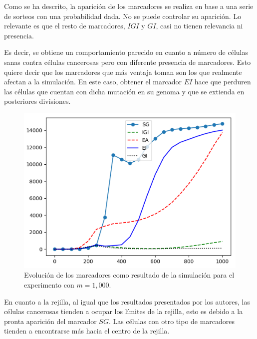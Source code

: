 Como se ha descrito, la aparición de los marcadores se realiza en base a una serie de sorteos con una probabilidad dada.
No se puede controlar su aparición. Lo relevante es que el resto de marcadores, $IGI$ y $GI$, casi no tienen relevancia
ni presencia.

Es decir, se obtiene un comportamiento parecido en cuanto a número de células sanas contra células cancerosas pero
con diferente presencia de marcadores. Esto quiere decir que los marcadores que más ventaja toman son los que realmente
afectan a la simulación. En este caso, obtener el marcador $EI$ hace que perduren las células que cuentan con dicha
mutación en su genoma y que se extienda en posteriores divisiones.

\begin{figure}[h]
\centering
\includegraphics[scale=0.8]{figures/experiments/exp2/mutations}
\caption{Evolución de los marcadores como resultado de la simulación para el experimento con $m = 1,000$.}
\end{figure}

En cuanto a la rejilla, al igual que los resultados presentados por los autores, las células cancerosas
tienden a ocupar los límites de la rejilla, esto es debido a la pronta aparición del marcador $SG$. Las células con
otro tipo de marcadores tienden a encontrarse más hacia el centro de la rejilla.


